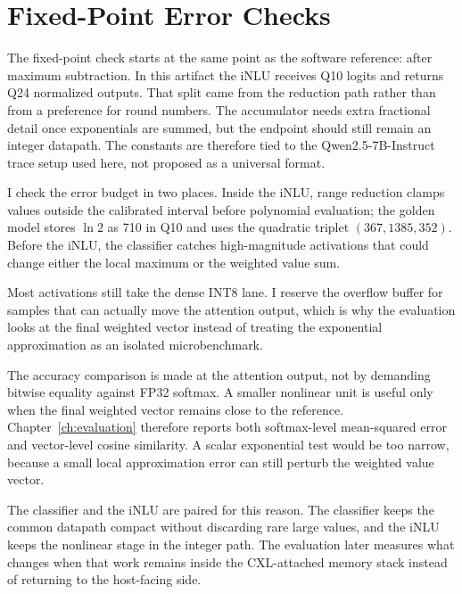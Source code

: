 \section{Fixed-Point Error Checks}

The fixed-point check starts at the same point as the software reference: after maximum subtraction. In this artifact the iNLU receives Q10 logits and returns Q24 normalized outputs. That split came from the reduction path rather than from a preference for round numbers. The accumulator needs extra fractional detail once exponentials are summed, but the endpoint should still remain an integer datapath. The constants are therefore tied to the Qwen2.5-7B-Instruct trace setup used here, not proposed as a universal format.

I check the error budget in two places. Inside the iNLU, range reduction clamps values outside the calibrated interval before polynomial evaluation; the golden model stores $\ln 2$ as 710 in Q10 and uses the quadratic triplet $(367, 1385, 352)$. Before the iNLU, the classifier catches high-magnitude activations that could change either the local maximum or the weighted value sum.

Most activations still take the dense INT8 lane. I reserve the overflow buffer for samples that can actually move the attention output, which is why the evaluation looks at the final weighted vector instead of treating the exponential approximation as an isolated microbenchmark.

The accuracy comparison is made at the attention output, not by demanding bitwise equality against FP32 softmax. A smaller nonlinear unit is useful only when the final weighted vector remains close to the reference. Chapter~\ref{ch:evaluation} therefore reports both softmax-level mean-squared error and vector-level cosine similarity. A scalar exponential test would be too narrow, because a small local approximation error can still perturb the weighted value vector.

The classifier and the iNLU are paired for this reason. The classifier keeps the common datapath compact without discarding rare large values, and the iNLU keeps the nonlinear stage in the integer path. The evaluation later measures what changes when that work remains inside the CXL-attached memory stack instead of returning to the host-facing side.
